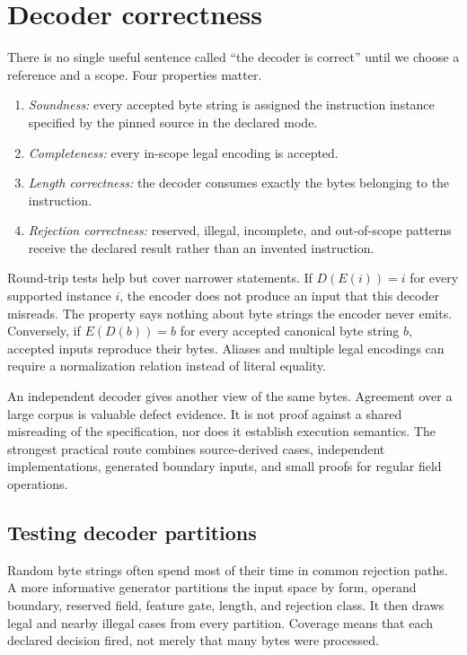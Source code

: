 \section{Decoder correctness}

There is no single useful sentence called ``the decoder is correct'' until we
choose a reference and a scope. Four properties matter.

\begin{enumerate}
\item \emph{Soundness:} every accepted byte string is assigned the instruction
instance specified by the pinned source in the declared mode.
\item \emph{Completeness:} every in-scope legal encoding is accepted.
\item \emph{Length correctness:} the decoder consumes exactly the bytes
belonging to the instruction.
\item \emph{Rejection correctness:} reserved, illegal, incomplete, and
out-of-scope patterns receive the declared result rather than an invented
instruction.
\end{enumerate}

Round-trip tests help but cover narrower statements. If
\(D(E(i))=i\) for every supported instance \(i\), the encoder does not produce
an input that this decoder misreads. The property says nothing about byte
strings the encoder never emits. Conversely, if \(E(D(b))=b\) for every
accepted canonical byte string \(b\), accepted inputs reproduce their bytes.
Aliases and multiple legal encodings can require a normalization relation
instead of literal equality.

An independent decoder gives another view of the same bytes. Agreement over a
large corpus is valuable defect evidence. It is not proof against a shared
misreading of the specification, nor does it establish execution semantics.
The strongest practical route combines source-derived cases, independent
implementations, generated boundary inputs, and small proofs for regular field
operations.

\subsection{Testing decoder partitions}

Random byte strings often spend most of their time in common rejection paths.
A more informative generator partitions the input space by form, operand
boundary, reserved field, feature gate, length, and rejection class. It then
draws legal and nearby illegal cases from every partition. Coverage means that
each declared decision fired, not merely that many bytes were processed.

